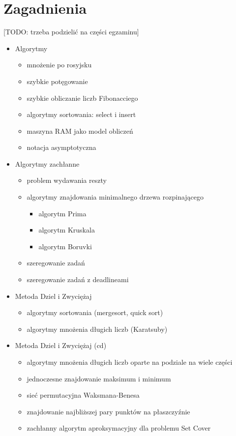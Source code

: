 \documentclass[svgnames]{report}
\begin{document}
\tableofcontents
\chapter{Zagadnienia}
[TODO: trzeba podzielić na części egzaminu]
\begin{itemize}

\item Algorytmy
\begin{itemize}
	\item mnożenie po rosyjsku
	\item szybkie potęgowanie
	\item szybkie obliczanie liczb Fibonacciego
	\item algorytmy sortowania: select i insert
	\item maszyna RAM jako model obliczeń
	\item notacja asymptotyczna
\end{itemize}

\item Algorytmy zachłanne
\begin{itemize}
	\item problem wydawania reszty
	\item algorytmy znajdowania minimalnego drzewa rozpinającego
	\begin{itemize}
		\item algorytm Prima
		\item algorytm Kruskala
		\item algorytm Boruvki
	\end{itemize}
	\item szeregowanie zadań
	\item szeregowanie zadań z deadlineami
\end{itemize}

\item Metoda Dziel i Zwyciężaj
\begin{itemize}
	\item algorytmy sortowania (mergesort, quick sort)
	\item algorytmy mnożenia długich liczb (Karatsuby)
\end{itemize}

\item Metoda Dziel i Zwyciężaj (cd)
\begin{itemize}
	\item algorytmy mnożenia długich liczb oparte na podziale na wiele części
	\item jednoczesne znajdowanie maksimum i minimum
	\item sieć permutacyjna Waksmana-Benesa
	\item znajdowanie najbliższej pary punktów na płaszczyźnie
	\item zachłanny algorytm aproksymacyjny dla problemu Set Cover
\end{itemize}


\end{itemize}
\end{document}
